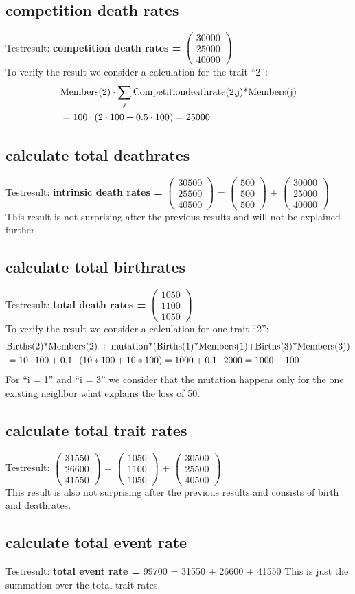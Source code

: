 \documentclass{article}
\newcommand{\vect}[3]{\ensuremath{\begin{pmatrix}	#1 \\ #2 \\ #3	\end{pmatrix}}}
\begin{document}
\subsection{competition death rates}
Testresult: \textbf{competition death rates = } \vect{30000}{25000}{40000}\\
To verify the result we consider a calculation for the trait "`2"':
\begin{align*}
&\textnormal{Members(2)} \cdot \sum_{j}{\textnormal{Competitiondeathrate(2,j)*Members(j)}}\\
&= 100 \cdot (2 \cdot 100 + 0.5 \cdot 100) = 25000
\end{align*}

\subsection{calculate total deathrates}
Testresult: \textbf{intrinsic death rates = } 
\vect{30500}{25500}{40500} = \vect{500}{500}{500} + \vect{30000}{25000}{40000}\\
This result is not surprising after the previous results and will not be explained further.

\subsection{calculate total birthrates}
Testresult: \textbf{total death rates = } \vect{1050}{1100}{1050}\\
To verify the result we consider a calculation for one trait "`2"':
\begin{align*}
&\textnormal{Births(2)*Members(2) + mutation*(Births(1)*Members(1)+Births(3)*Members(3))}\\
&= 10 \cdot 100 + 0.1 \cdot (10 * 100 + 10 * 100) = 1000 + 0.1 \cdot 2000 = 1000 + 100
\end{align*}
For "`i = 1"' and "`i = 3"' we consider that the mutation happens only for the one existing neighbor what explains the loss of 50.

\subsection{calculate total trait rates}
Testresult: 
\vect{31550}{26600}{41550} = \vect{1050}{1100}{1050} + \vect{30500}{25500}{40500}\\
This result is also not surprising after the previous results and consists of birth and deathrates.

\subsection{calculate total event rate}
Testresult: \textbf{total event rate =} 99700 = 31550 + 26600 + 41550
This is just the summation over the total trait rates.
\end{document}
